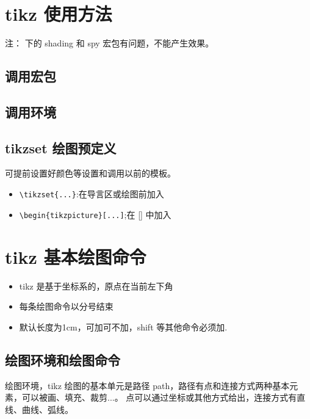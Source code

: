 \section{tikz 使用方法}
注： \XeLaTeX 下的 shading 和 spy 宏包有问题，不能产生效果。
\subsection{调用宏包}
\subsection{调用环境}
\subsection{tikzset 绘图预定义}
可提前设置好颜色等设置和调用以前的模板。
\begin{itemize}
  \item \verb|\tikzset{...}|:在导言区或绘图前加入
  \item \verb|\begin{tikzpicture}[...]|;在 [] 中加入
\end{itemize}
\section{tikz 基本绘图命令}
\begin{itemize}
  \item tikz 是基于坐标系的，原点在当前左下角
  \item 每条绘图命令以分号结束
  \item 默认长度为1cm，可加可不加，shift 等其他命令必须加.
\end{itemize}


\subsection{绘图环境和绘图命令}
绘图环境，tikz 绘图的基本单元是路径 path，路径有点和连接方式两种基本元素，可以被画、填充、裁剪...。
点可以通过坐标或其他方式给出，连接方式有直线、曲线、弧线。


